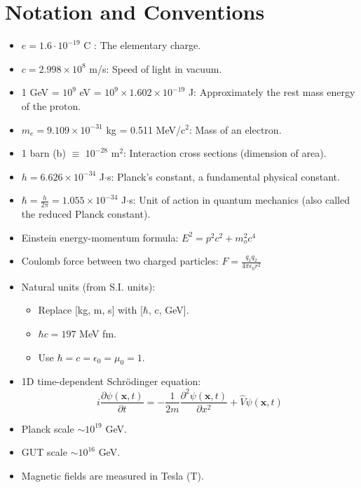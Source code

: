 \documentclass[a4paper, american, 12pt]{report}
\begin{document}
	\chapter*{Notation and Conventions}
	\label{chap:Notations}
	\begin{itemize}
		\item $e=1.6\cdot10^{-19}$ C : The elementary charge.
		\item $c=2.998\times 10^{8}$ m/s: Speed of light in vacuum.
		\item 1 GeV = $10^9$ eV = $10^9\times 1.602\times 10^{-19}$ J: Approximately the rest mass energy of the proton.
		\item $m_e=9.109\times 10^{-31}$ kg = 0.511 MeV/c$^2$: Mass of an electron.
		\item  1 barn (b) $\equiv$ $10^{-28}$ m$^2$: Interaction cross sections (dimension of area).
		\item $h=6.626\times 10^{-34}$ J$\cdot$s: Planck's constant, a fundamental physical constant.
		\item $\hbar=\frac{h}{2\pi}=1.055\times 10^{-34}$ J$\cdot$s: Unit of action in quantum mechanics (also called the reduced Planck constant).
		\item Einstein energy-momentum formula: $E^2=p^2c^2+m_o^2c^4$
		\item Coulomb force between two charged particles: $F=\frac{q_1q_2}{4\pi \epsilon_0 r^2}$
		\item Natural units (from S.I. units):
		\begin{itemize}
			\item Replace [kg, m, s] with [$\hbar$, c, GeV].
			\item $\hbar c=197$ MeV fm.
			\item Use $\hbar=c=\epsilon_0=\mu_0=1$.
		\end{itemize}
		\item 1D time-dependent Schrödinger equation: \[i\frac{\partial \psi(\textbf{x},t)}{\partial t}=-\frac{1}{2m}\frac{\partial ^2\psi(\textbf{x},t)}{\partial x^2}+\hat{V}\psi(\textbf{x},t)\]
		\item Planck scale $\sim 10^{19}$ GeV.
		\item GUT scale $\sim 10^{16}$ GeV.
		\item Magnetic fields are measured in Tesla (T).
	\end{itemize}
		


\end{document}
